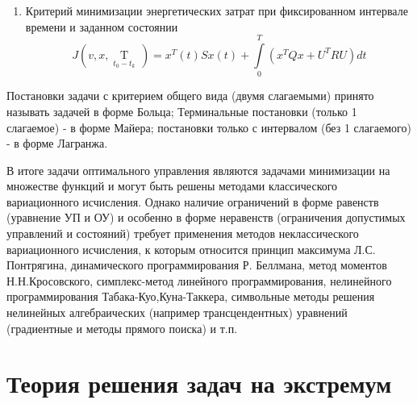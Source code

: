 \documentclass[preprint,russian,a5paper,10pt,twoside]{ncc}
\begin{document}
\begin{itemize}
\begin{enumerate}[resume]
\item Критерий минимизации энергетических затрат при фиксированном интервале времени и заданном состоянии 
\[J\left( v,x,\underset{{{t}_{0}}-{{t}_{k}}}{\mathop{T}}\, \right)={{x}^{T}}\left( t \right)Sx\left( t \right)+\int\limits_{0}^{T}{\left( {{x}^{T}}Qx+{{U}^{T}}RU \right)}dt\] 
 \end{enumerate}
Постановки задачи с критерием общего вида (двумя слагаемыми) принято называть задачей в форме Больца; Терминальные постановки (только 1 слагаемое) - в форме Майера; постановки только с интервалом (без 1 слагаемого) - в форме Лагранжа.
\end{itemize}
\par В итоге задачи оптимального управления являются задачами минимизации на множестве функций и могут быть решены методами классического вариационного исчисления. Однако наличие ограничений в форме равенств (уравнение УП и ОУ) и особенно в форме неравенств (ограничения допустимых управлений и состояний) требует применения методов неклассического вариационного исчисления, к которым относится принцип максимума Л.С. Понтрягина, динамического программирования Р. Беллмана, метод моментов Н.Н.Кросовского, симплекс-метод линейного программирования, нелинейного программирования Табака-Куо,Куна-Таккера, символьные методы решения нелинейных алгебраических (например трансцендентных) уравнений (градиентные и методы прямого поиска) и т.п.





\clearpage
\section{Теория решения задач на экстремум\label{extremum}}
\end{document}
